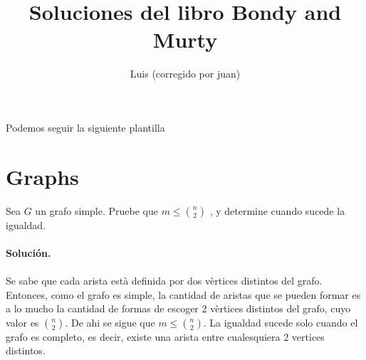 \documentclass[12pt]{article}
\newenvironment{ejercicio}[2][Ejercicio]{\begin{trivlist}
\item[\hskip \labelsep {\bfseries #1}\hskip \labelsep {\bfseries #2.}]}{\end{trivlist}}
\begin{document}
 


 
\title{Soluciones del libro Bondy and Murty}
\author{Luis (corregido por juan)}
\maketitle

Podemos seguir la siguiente plantilla

\section{Graphs}

\begin{ejercicio}{1.1.1}
\end{ejercicio}
Sea $G$ un grafo simple. Pruebe que $m \leq \binom{n}{2}$
, y determine cuando sucede la igualdad.
\\\\
\textbf{Solución.} 
\\\\
Se sabe que cada arista està definida por dos vèrtices distintos del grafo. Entonces, como el grafo es simple, la cantidad de aristas que se pueden formar es a lo mucho la cantidad de formas de escoger 2 vèrtices distintos del grafo, cuyo valor es $\binom{n}{2}$. De ahi se sigue que $m \leq \binom{n}{2}$. La igualdad sucede solo cuando el grafo es completo, es decir, existe una arista entre cualesquiera 2 vertices distintos.
\end{document}
